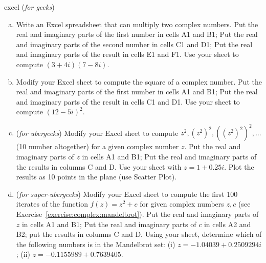 \begin{exercise}{excel} (\emph{for geeks})
\begin{enumerate}[(a)]
\item
Write an Excel spreadsheet that can multiply two complex numbers. Put the real and imaginary parts of the first number in cells A1 and B1; Put the real and imaginary parts of the second number in cells C1 and D1; Put the real and imaginary parts of the result in cells E1 and F1. Use your sheet to compute $(3 + 4i)(7 - 8i)$.
\item
Modify your Excel sheet to compute the square of a complex number. Put the real and imaginary parts of the first number in cells A1 and B1; Put the real and imaginary parts of the result in cells C1 and D1. Use your sheet to compute $(12 - 5i)^2$.
\item 
(\emph{for ubergeeks}) Modify your Excel sheet to compute $z^2, (z^2)^2,((z^2)^2)^2, \ldots$ (10 number altogether) for a given complex number $z$. Put the real and imaginary parts of $z$ in cells A1 and B1; Put the real and imaginary parts of the results in columns C and D. Use your sheet with $z = 1 + 0.25 i$. Plot the results as 10 points in the plane (use Scatter Plot).
\item
(\emph{for super-ubergeeks}) Modify your Excel sheet to compute the first 100 iterates of the function $f(z) = z^2 + c$ for given complex numbers $z,c$ (see Exercise~\ref{exercise:complex:mandelbrot}). Put the real and imaginary parts of $z$ in cells A1 and B1; Put the real and imaginary parts of $c$ in cells A2 and B2; put the results in columns C and D. Using your sheet, determine which of the following numbers is in the Mandelbrot set: (i) $z = -1.04039 + 0.2509294i$; (ii) $z=-0.1155989 + 0.7639405$.
\end{enumerate}
\end{exercise} 

